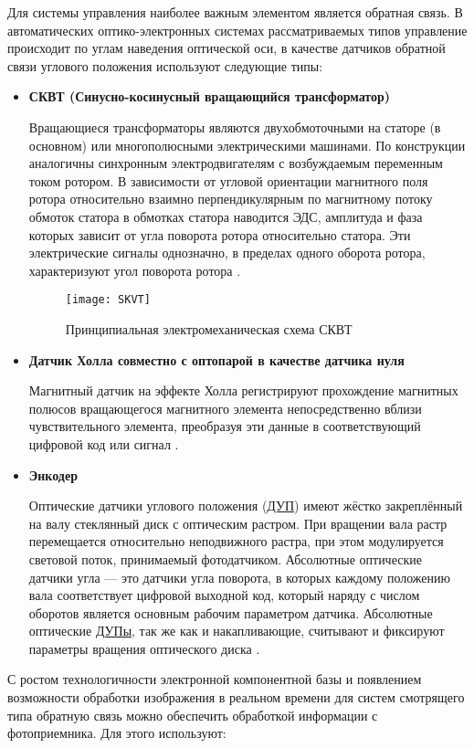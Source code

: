 Для системы управления наиболее важным элементом является обратная связь. В автоматических оптико-электронных системах рассматриваемых типов управление происходит по углам наведения оптической оси, в качестве датчиков обратной связи углового положения используют следующие типы:
\begin{itemize}
	\item \textbf{СКВТ (Синусно-косинусный вращающийся трансформатор)}
	
	Вращающиеся трансформаторы являются двухобмоточными на статоре (в основном) или многополюсными электрическими машинами. По конструкции аналогичны синхронным электродвигателям с возбуждаемым переменным током ротором. В зависимости от угловой ориентации магнитного поля ротора относительно взаимно перпендикулярным по магнитному потоку обмоток статора в обмотках статора наводится ЭДС, амплитуда и фаза которых зависит от угла поворота ротора относительно статора. Эти электрические сигналы однозначно, в пределах одного оборота ротора, характеризуют угол поворота ротора \cite[]{SKVT}.
	
	\begin{figure}[ht]
		\centering
		\texttt{[image: SKVT]} 
		\caption{Принципиальная электромеханическая схема СКВТ \cite[]{1310HM025}}
		\label{fig:SKVT}
	\end{figure}
	
	\item \textbf{Датчик Холла совместно с оптопарой в качестве датчика нуля}

	Магнитный датчик на эффекте Холла регистрируют прохождение магнитных полюсов вращающегося магнитного элемента непосредственно вблизи чувствительного элемента, преобразуя эти данные в соответствующий цифровой код или сигнал \cite[]{Encoder}.
	
	\item \textbf{Энкодер}
	
	Оптические датчики углового положения (\hyperref[acroDUP]{ДУП}) имеют жёстко закреплённый на валу стеклянный диск с оптическим растром. При вращении вала растр перемещается относительно неподвижного растра, при этом модулируется световой поток, принимаемый фотодатчиком. Абсолютные оптические датчики угла — это датчики угла поворота, в которых каждому положению вала соответствует цифровой выходной код, который наряду с числом оборотов является основным рабочим параметром датчика. Абсолютные оптические \hyperref[acroDUP]{ДУПы}, так же как и накапливающие, считывают и фиксируют параметры вращения оптического диска \cite[]{Encoder}.
	
\end{itemize}
С ростом технологичности электронной компонентной базы и появлением возможности обработки изображения в реальном времени для систем смотрящего типа обратную связь можно обеспечить обработкой информации с фотоприемника. Для этого используют:

